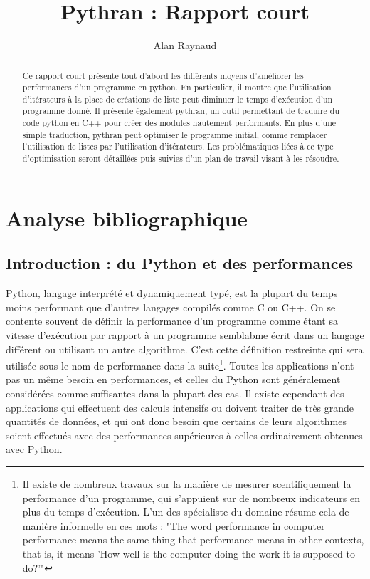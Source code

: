 \documentclass[a4paper]{article}
\title{Pythran : Rapport court}
\author{Alan Raynaud}
\date{}
\begin{document}

\maketitle   
\begin{abstract}
  Ce rapport court présente tout d'abord les différents moyens
  d'améliorer les performances d'un programme en python. En
  particulier, il montre que l'utilisation d'itérateurs à la place de
  créations de liste peut diminuer le temps d'exécution d'un programme
  donné. Il présente également pythran, un outil permettant de
  traduire du code python en C++ pour créer des modules hautement
  performants. En plus d'une simple traduction, pythran peut optimiser
  le programme initial, comme remplacer l'utilisation de listes par
  l'utilisation d'itérateurs. Les problématiques liées à ce type
  d'optimisation seront détaillées puis suivies d'un plan de travail
  visant à les résoudre.
\end{abstract}

\clearpage               

\tableofcontents            

\clearpage

\section{Analyse bibliographique}             

\subsection{Introduction : du Python et des performances}

Python, langage interprété et dynamiquement typé, est la plupart du
temps moins performant que d'autres langages compilés comme C ou
C++\cite{PythonVsCpp}. On se contente souvent de définir la
performance d'un programme comme étant sa vitesse d'exécution par
rapport à un programme semblabme écrit dans un langage différent ou
utilisant un autre algorithme. C'est cette définition restreinte qui
sera utilisée sous le nom de performance dans la suite\footnote{Il
  existe de nombreux travaux sur la manière de mesurer scentifiquement
  la performance d'un programme, qui s'appuient sur de nombreux
  indicateurs en plus du temps d'exécution. L'un des spécialiste du
  domaine résume cela de manière informelle en ces mots : "The word
  performance in computer performance means the same thing that
  performance means in other contexts, that is, it means 'How well is
  the computer doing the work it is supposed to
  do?'"\cite{Allen}}. Toutes les applications n'ont pas un même besoin
en performances, et celles du Python sont généralement considérées
comme suffisantes dans la plupart des cas. Il existe cependant des
applications qui effectuent des calculs intensifs ou doivent traiter
de très grande quantités de données, et qui ont donc besoin que
certains de leurs algorithmes soient effectués avec des performances
supérieures à celles ordinairement obtenues avec Python.
\end{document}

